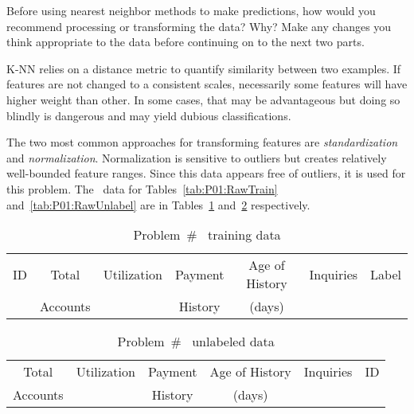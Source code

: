 \begin{subproblem}
  Before using nearest neighbor methods to make predictions, how would you recommend processing or transforming the data? Why? Make any changes you think appropriate to the data before continuing on to the next two parts.
\end{subproblem}

K-NN relies on a distance metric to quantify similarity between two examples.  If features are not changed to a consistent scales, necessarily some features will have higher weight than other.  In some cases, that may be advantageous but doing so blindly is dangerous and may yield dubious classifications.

The two most common approaches for transforming features are \textit{standardization} and \textit{normalization}.  Normalization is sensitive to outliers but creates relatively well-bounded feature ranges.  Since this data appears free of outliers, it is used for this problem. The \featureOp\ data for Tables~\ref{tab:P01:RawTrain} and~\ref{tab:P01:RawUnlabel} are in Tables~\ref{tab:P01:NormalTrain} and~\ref{tab:P01:NormalUnlabel} respectively.

\begin{table}[h]
  \centering
  \caption{Problem~\# \featureOp\ training data}\label{tab:P01:NormalTrain}
  \begin{tabular}{|c||c|c|c|c|c|c|}
    \hline
    ID & Total    & Utilization & Payment & Age of History & Inquiries & Label \\
       & Accounts &             & History & (days)         &           & \\\hline\hline
    
  \end{tabular}
\end{table}

\begin{table}[h]
  \centering
  \caption{Problem~\# \featureOp\ unlabeled data}\label{tab:P01:NormalUnlabel}
  \begin{tabular}{|c|c|c|c|c||c|}
    \hline
    Total    & Utilization & Payment & Age of History & Inquiries & ID \\
    Accounts &             & History & (days)         &           & \\\hline\hline
    
  \end{tabular}
\end{table}

